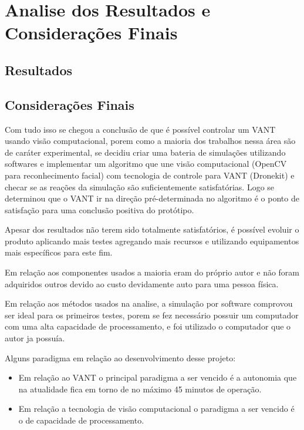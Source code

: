 \chapter{Analise dos Resultados e Considerações Finais}\label{cap:apresAnaRes}




\section{Resultados}
 
\section{Considerações Finais}

Com tudo isso se chegou a conclusão de que é possível controlar um VANT usando visão computacional, porem como a maioria dos trabalhos nessa área são de caráter experimental, se decidiu criar uma bateria de simulações utilizando softwares e implementar um algoritmo que une visão computacional (OpenCV para reconhecimento facial) com tecnologia de controle para VANT (Dronekit) e checar se as reações da simulação são suficientemente satisfatórias. Logo se determinou que o VANT ir na direção pré-determinada no algoritmo é o ponto de satisfação para uma conclusão positiva do protótipo.

Apesar dos resultados não terem sido totalmente satisfatórios, é possível evoluir o produto aplicando mais testes agregando mais recursos e utilizando equipamentos mais específicos para este fim.

Em relação aos componentes usados a maioria eram do próprio autor e não foram adquiridos outros devido ao custo devidamente auto para uma pessoa física.  
 
Em relação aos métodos usados na analise, a simulação por software comprovou ser ideal para os primeiros testes, porem se fez necessário possuir um computador com uma alta capacidade de processamento, e foi utilizado o computador que o autor ja possuía. 

Alguns paradigma em relação ao desenvolvimento desse projeto:

\begin{itemize}
	\item Em relação ao VANT o principal paradigma a ser vencido é a autonomia que na atualidade fica em torno de no máximo 45 minutos de operação.
	\item Em relação a tecnologia de visão computacional o paradigma a ser vencido é o de capacidade de processamento.
\end{itemize}

